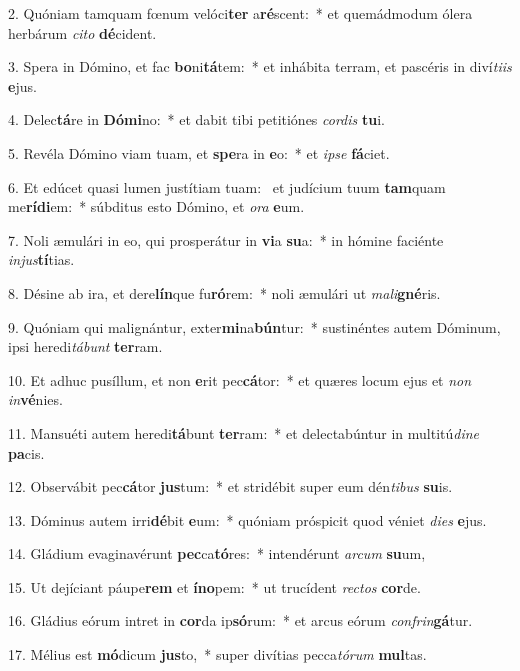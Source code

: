 2. Quóniam tamquam fœnum velóci\textbf{ter} a\textbf{ré}scent:~*  et quemádmodum ólera herbárum \textit{ci}\textit{to} \textbf{dé}cident.\

3. Spera in Dómino, et fac \textbf{bo}ni\textbf{tá}tem:~*  et inhábita terram, et pascéris in diví\textit{ti}\textit{is} \textbf{e}jus.\

4. Delec\textbf{tá}re in \textbf{Dó}\textbf{mi}no:~*  et dabit tibi petitiónes \textit{cor}\textit{dis} \textbf{tu}i.\

5. Revéla Dómino viam tuam, et \textbf{spe}ra in \textbf{e}o:~*  et \textit{ip}\textit{se} \textbf{fá}ciet.\

6. Et edúcet quasi lumen justítiam tuam: \dag\  et judícium tuum \textbf{tam}quam me\textbf{rí}\textbf{di}em:~*  súbditus esto Dómino, et \textit{o}\textit{ra} \textbf{e}um.\

7. Noli æmulári in eo, qui prosperátur in \textbf{vi}a \textbf{su}a:~*  in hómine faciénte \textit{in}\textit{jus}\textbf{tí}tias.\

8. Désine ab ira, et dere\textbf{lín}que fu\textbf{ró}rem:~*  noli æmulári ut \textit{ma}\textit{li}\textbf{gné}ris.\

9. Quóniam qui malignántur, exter\textbf{mi}na\textbf{bún}tur:~*  sustinéntes autem Dóminum, ipsi heredi\textit{tá}\textit{bunt} \textbf{ter}ram.\

10. Et adhuc pusíllum, et non \textbf{e}rit pec\textbf{cá}tor:~*  et quæres locum ejus et \textit{non} \textit{in}\textbf{vé}nies.\

11. Mansuéti autem heredi\textbf{tá}bunt \textbf{ter}ram:~*  et delectabúntur in multitú\textit{di}\textit{ne} \textbf{pa}cis.\

12. Observábit pec\textbf{cá}tor \textbf{jus}tum:~*  et stridébit super eum dén\textit{ti}\textit{bus} \textbf{su}is.\

13. Dóminus autem irri\textbf{dé}bit \textbf{e}um:~*  quóniam próspicit quod véniet \textit{di}\textit{es} \textbf{e}jus.\

14. Gládium evaginavérunt \textbf{pec}ca\textbf{tó}res:~*  intendérunt \textit{ar}\textit{cum} \textbf{su}um,\

15. Ut dejíciant páupe\textbf{rem} et \textbf{ín}\textbf{o}pem:~*  ut trucídent \textit{rec}\textit{tos} \textbf{cor}de.\

16. Gládius eórum intret in \textbf{cor}da ip\textbf{só}rum:~*  et arcus eórum \textit{con}\textit{frin}\textbf{gá}tur.\

17. Mélius est \textbf{mó}dicum \textbf{jus}to,~*  super divítias pecca\textit{tó}\textit{rum} \textbf{mul}tas.\

